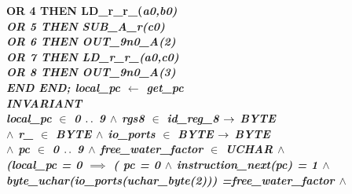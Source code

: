 \documentclass[11pt]{article} %
\begin{document}
{\begin{sloppypar}
\hspace*{1.00in}\bf OR \rm 4 \bf THEN \hspace*{0.47in}\bf LD\_r\_r\_\rm (\it a0\rm ,\it b0\rm )\\
\hspace*{1.00in}\bf OR \rm 5 \bf THEN \hspace*{0.47in}\bf SUB\_A\_r\rm (\it c0\rm )\\
\hspace*{1.00in}\bf OR \rm 6 \bf THEN \hspace*{0.47in}\bf OUT\_9n0\_A\rm (\rm 2\rm )\\ 
\hspace*{1.00in}\bf OR \rm 7 \bf THEN \hspace*{0.47in}\bf LD\_r\_r\_\rm (\it a0\rm ,\it c0\rm )\\
\hspace*{1.00in}\bf OR \rm 8 \bf THEN \hspace*{0.47in}\bf OUT\_9n0\_A\rm (\rm 3\rm )\\ 
\hspace*{1.00in}\bf END
\hspace*{0.20in}\bf END\rm ;
\hspace*{0.20in}\it local\_pc  $\leftarrow$  \bf get\_pc\\
\hspace*{0.70in}\bf INVARIANT\\
\hspace*{0.80in}\it local\_pc  $\in$  \rm 0 $\mathbin{\ldotp\ldotp}$ \rm 9  $\land$  \it rgs8  $\in$  \it id\_reg\_8 
$\rightarrow$  \it BYTE\\
\hspace*{0.80in} $\land$  \it r\_\hspace*{0.10in} $\in$  \it BYTE  $\land$  \it io\_ports  $\in$  \it
BYTE  $\rightarrow$  \it BYTE\\
\hspace*{0.80in} $\land$  \it pc  $\in$  \rm 0 $\mathbin{\ldotp\ldotp}$ \rm 9  $\land$  \it free\_water\_factor  $\in$ 
\it UCHAR  $\land$\\
\hspace*{0.80in}\rm (\it local\_pc \rm = \rm 0  $\implies$  \rm ( \it pc \rm = \rm 0  $\land$  \it
instruction\_next\rm (\it pc\rm ) \rm = \rm 1  $\land$\\
\hspace*{1.10in}\it byte\_uchar\rm (\it io\_ports\rm (\it uchar\_byte\rm (\rm 2\rm )\rm )\rm ) \rm
=\hspace*{0.10in}\it free\_water\_factor  $\land$\\

\end{sloppypar}}
\end{document}
